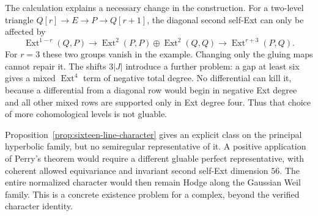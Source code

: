 The calculation explains a necessary change in the construction. For a two-level triangle $Q[r]\to E\to P\to Q[r+1]$, the diagonal second self-Ext can only be affected by
\[
 \operatorname{Ext}^{1-r}(Q,P)\longrightarrow
 \operatorname{Ext}^2(P,P)\oplus\operatorname{Ext}^2(Q,Q)
 \longrightarrow\operatorname{Ext}^{r+3}(P,Q).
\]
For $r=3$ these two groups vanish in the example. Changing only the gluing maps cannot repair it. The shifts $3|J|$ introduce a further problem: a gap at least six gives a mixed $\operatorname{Ext}^4$ term of negative total degree. No differential can kill it, because a differential from a diagonal row would begin in negative Ext degree and all other mixed rows are supported only in Ext degree four. Thus that choice of more cohomological levels is not gluable.

Proposition~\ref{prop:sixteen-line-character} gives an explicit class on the principal hyperbolic family, but no semiregular representative of it. A positive application of Perry's theorem would require a different gluable perfect representative, with coherent allowed equivariance and invariant second self-Ext dimension $56$. The entire normalized character would then remain Hodge along the Gaussian Weil family. This is a concrete existence problem for a complex, beyond the verified character identity.
